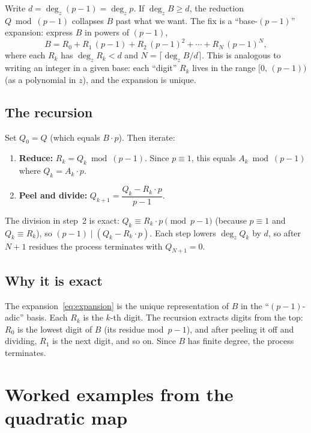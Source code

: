 \documentclass[11pt]{article}
\begin{document}
Write $d=\deg_z(p-1)=\deg_z p$.  If $\deg_z B\ge d$, the reduction
$Q\bmod(p{-}1)$ collapses $B$ past what we want.  The fix is a
``base-$(p{-}1)$'' expansion: express $B$ in powers of $(p-1)$,
\begin{equation}\label{eq:expansion}
B = R_0 + R_1\,(p{-}1) + R_2\,(p{-}1)^2 + \cdots + R_N\,(p{-}1)^N,
\end{equation}
where each $R_k$ has $\deg_z R_k < d$ and
$N=\lceil\deg_z B/d\rceil$.  This is analogous to writing an integer in a
given base: each ``digit'' $R_k$ lives in the range $[0,\,(p{-}1))$ (as a
polynomial in $z$), and the expansion is unique.

\subsection{The recursion}

Set $Q_0=Q$ (which equals $B\cdot p$).  Then iterate:
\begin{enumerate}
\item \textbf{Reduce:} $R_k = Q_k \bmod (p{-}1)$.  Since $p\equiv 1$, this
      equals $A_k\bmod(p{-}1)$ where $Q_k=A_k\cdot p$.
\item \textbf{Peel and divide:}
      $Q_{k+1} = \dfrac{Q_k - R_k\cdot p}{p-1}$.
\end{enumerate}
The division in step~2 is exact: $Q_k\equiv R_k\cdot p\pmod{p{-}1}$ (because
$p\equiv 1$ and $Q_k\equiv R_k$), so $(p{-}1)\mid(Q_k-R_k\cdot p)$.  Each
step lowers $\deg_z Q_k$ by $d$, so after $N+1$ residues the process
terminates with $Q_{N+1}=0$.

\subsection{Why it is exact}

The expansion~\eqref{eq:expansion} is the unique representation of $B$ in
the ``$(p{-}1)$-adic'' basis.  Each $R_k$ is the $k$-th digit.  The
recursion extracts digits from the top: $R_0$ is the lowest digit of $B$
(its residue mod~$p{-}1$), and after peeling it off and dividing, $R_1$ is
the next digit, and so on.  Since $B$ has finite degree, the process
terminates.

\section{Worked examples from the quadratic map}
\label{sec:examples}
\end{document}
